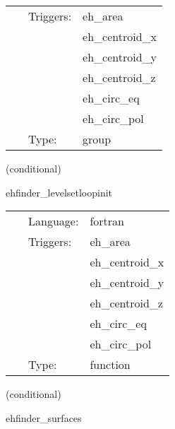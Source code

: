 \hspace{5mm}{\it loop over the level set functions } 


\hspace{5mm}

 \begin{tabular*}{160mm}{cll} 
~ & Triggers:  & eh\_area \\ 
~& ~ &eh\_centroid\_x\\ 
~& ~ &eh\_centroid\_y\\ 
~& ~ &eh\_centroid\_z\\ 
~& ~ &eh\_circ\_eq\\ 
~& ~ &eh\_circ\_pol\\ 
~ & Type:  & group \\ 
\end{tabular*} 


\vspace{5mm}

   (conditional) 

\hspace{5mm} ehfinder\_levelsetloopinit 

\hspace{5mm}{\it initialize the loop counter over the level set functions } 


\hspace{5mm}

 \begin{tabular*}{160mm}{cll} 
~ & Language:  & fortran \\ 
~ & Triggers:  & eh\_area \\ 
~& ~ &eh\_centroid\_x\\ 
~& ~ &eh\_centroid\_y\\ 
~& ~ &eh\_centroid\_z\\ 
~& ~ &eh\_circ\_eq\\ 
~& ~ &eh\_circ\_pol\\ 
~ & Type:  & function \\ 
\end{tabular*} 


\vspace{5mm}

   (conditional) 

\hspace{5mm} ehfinder\_surfaces 

\hspace{5mm}{\it count the number of surfaces and integrate over them } 


\hspace{5mm}

